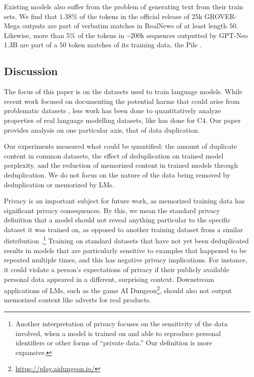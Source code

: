 Existing models also suffer from the problem of generating text from their train sets.
We find that $1.38\%$ of the tokens in the official release of 25k GROVER-Mega outputs
are part of verbatim matches in RealNews of at least length $50$.
Likewise, more than 5\% of the tokens in \textasciitilde 200k sequences outputted by GPT-Neo 1.3B \citep{gpt-neo} are part of a $50$ token matches of its training data, the Pile \citep{pile}.

\subsection{Discussion}
The focus of this paper is on the datasets used to train language models.
While recent work focused on documenting the potential harms that could arise from problematic datasets  \cite{bender2018data, gebru2020datasheets}, less work has been done to 
quantitatively analyze properties of real language modelling datasets, like \citet{dodge2021documenting} has done for C4.
Our paper provides analysis on one particular axis, that of data duplication.

Our experiments measured what could be quantified: the amount of duplicate content in common datasets, the effect of deduplication on trained model perplexity, and the reduction of memorized content in trained models through deduplication.
We do not focus on the nature of the data being removed by deduplication or memorized by LMs.

Privacy is an important subject for future work, as memorized training data has significant privacy consequences.
By this, we mean the standard privacy definition that a model should not reveal anything particular to the specific dataset it was trained on, as opposed to another training dataset from a similar distribution \citep{shokri2017membership}.\footnote{%
Another interpretation of privacy focuses on the sensitivity of the data involved, when a model is trained on and able to reproduce personal identifiers or other forms of ``private data.'' Our definition is more expansive.}
Training on standard datasets that have not yet been deduplicated results in models that are particularly sensitive to examples that happened to be repeated multiple times, and this has negative privacy implications.
For instance, it could violate a person's expectations of privacy if their publicly available personal data appeared in a different, surprising context.
Downstream applications of LMs, such as the game AI Dungeon\footnote{\url{https://play.aidungeon.io/}}, should also not output memorized content like adverts for real products. 

